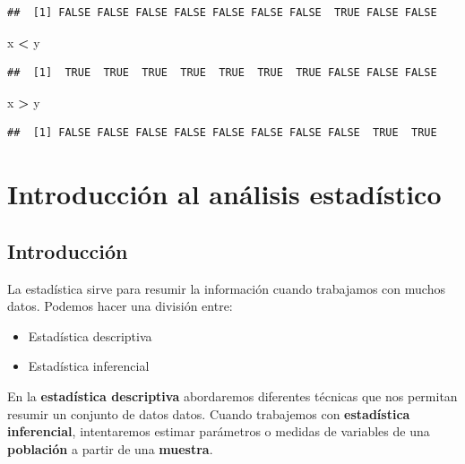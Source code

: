 \documentclass[spanish,]{book}
\newenvironment{Shaded}{\begin{snugshade}}{\end{snugshade}}
\newcommand{\StringTok}[1]{\textcolor[rgb]{0.31,0.60,0.02}{#1}}
\newcommand{\OperatorTok}[1]{\textcolor[rgb]{0.81,0.36,0.00}{\textbf{#1}}}
\newcommand{\NormalTok}[1]{#1}
\providecommand{\tightlist}{%
  \setlength{\itemsep}{0pt}\setlength{\parskip}{0pt}}
\begin{document}
\begin{verbatim}
##  [1] FALSE FALSE FALSE FALSE FALSE FALSE FALSE  TRUE FALSE FALSE
\end{verbatim}

\begin{Shaded}
\begin{Highlighting}[]
\NormalTok{x }\OperatorTok{<}\StringTok{ }\NormalTok{y}
\end{Highlighting}
\end{Shaded}

\begin{verbatim}
##  [1]  TRUE  TRUE  TRUE  TRUE  TRUE  TRUE  TRUE FALSE FALSE FALSE
\end{verbatim}

\begin{Shaded}
\begin{Highlighting}[]
\NormalTok{x }\OperatorTok{>}\StringTok{ }\NormalTok{y}
\end{Highlighting}
\end{Shaded}

\begin{verbatim}
##  [1] FALSE FALSE FALSE FALSE FALSE FALSE FALSE FALSE  TRUE  TRUE
\end{verbatim}

\part{Introducción al análisis
estadístico}\label{part-introduccion-al-analisis-estadistico}

\chapter{Introducción}\label{introduccion}

La estadística sirve para resumir la información cuando trabajamos con
muchos datos. Podemos hacer una división entre:

\begin{itemize}
\tightlist
\item
  Estadística descriptiva\\
\item
  Estadística inferencial
\end{itemize}

En la \textbf{estadística descriptiva} abordaremos diferentes técnicas
que nos permitan resumir un conjunto de datos datos. Cuando trabajemos
con \textbf{estadística inferencial}, intentaremos estimar parámetros o
medidas de variables de una \textbf{población} a partir de una
\textbf{muestra}.
\end{document}
